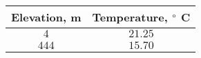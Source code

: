 \begin{tabular}[12pt]{ |c| c|}
    \hline
    Elevation, m & Temperature, $\degree$ C\\
    \hline
    $4$ & $21.25$\\
    \hline
    $444$ & $15.70$\\
    \hline
\end{tabular}